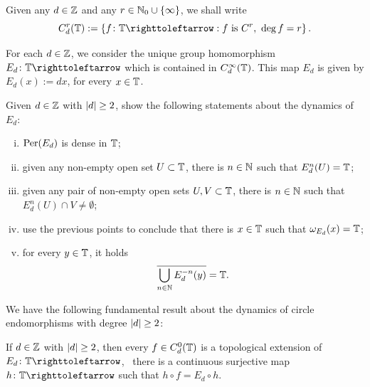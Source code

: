 Given any $d\in\mathbb{Z}$ and any $r\in\mathbb{N}_0\cup\{\infty\}$, we shall write
\begin{equation}
  \label{eq:degree-d-cirle-maps}
  C_d^r(\T):=\left\{f\colon\T\carr : f \text{ is } C^r,\ \deg f =r\right\}.
\end{equation}

For each $d\in\mathbb{Z}$, we consider the unique group homomorphism $E_d\colon\T\carr$ which is contained in $C_d^\infty(\mathbb{T})$. This map $E_d$ is given by $E_d(x):=d x$, for every $x\in\mathbb{T}$.

\begin{exercise}[Dynamics of $E_d$]
  Given $d\in\mathbb{Z}$ with $\left\lvert{d}\right\rvert\geq 2$, show the following statements about the dynamics of $E_d$:
  \begin{enumerate}[(i)]
    \item $\operatorname{Per}(E_d)$ is dense in $\mathbb{T}$;
    \item given any non-empty open set $U\subset\mathbb{T}$, there is $n\in\mathbb{N}$ such that $E_d^n(U)=\mathbb{T}$;
    \item given any pair of non-empty open sets $U,V\subset\mathbb{T}$, there is $n\in\mathbb{N}$ such that $E_d^n(U)\cap V\neq\emptyset$;
    \item use the previous points to conclude that there is $x\in\mathbb{T}$ such that $\omega_{E_d}(x)=\mathbb{T}$;
    \item for every $y\in\mathbb{T}$, it holds
          \begin{displaymath}
            \overline{\bigcup_{n\in\mathbb{N}} E_d^{-n}(y)}=\mathbb{T}.
          \end{displaymath}
  \end{enumerate}
\end{exercise}

We have the following fundamental result about the dynamics of circle endomorphisms with degree $\left\lvert{d}\right\rvert\geq 2$:

\begin{theorem}
  \label{thm:Ed-topological-factor}
  If $d\in\mathbb{Z}$ with $\left\lvert{d}\right\rvert\geq 2$, then every $f\in C_d^0(\mathbb{T})$ is a topological extension of $E_d\colon\T\carr$, \ie~there is a continuous surjective map $h\colon\T\carr$ such that $h\circ f=E_d\circ h$.
\end{theorem}

